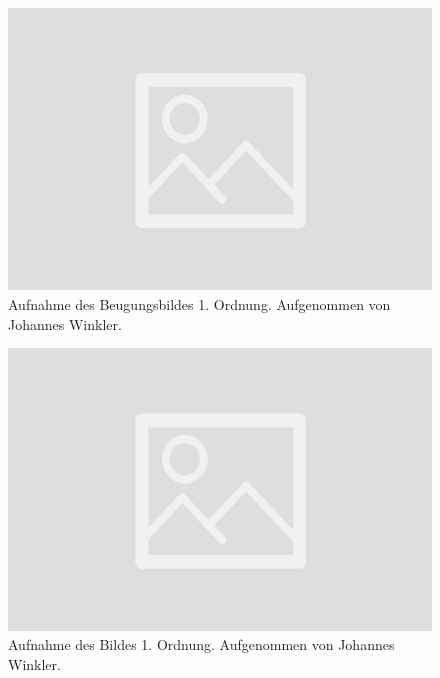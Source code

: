 \documentclass{article}
\begin{document}
\begin{minipage}[t]{.45\textwidth}
\begin{figure}[H]
\includegraphics[scale=0.1]{jw/Beugungsbild_1.jpg}
\caption{Aufnahme des Beugungsbildes 1. Ordnung. Aufgenommen von Johannes Winkler.}
\label{fig:bbild_1_jw}
\end{figure}
\end{minipage}
\hfill
\noindent
\begin{minipage}[t]{.45\textwidth}
\begin{figure}[H]
\includegraphics[scale=0.1]{jw/Bild_1.jpg}
\caption{Aufnahme des Bildes 1. Ordnung. Aufgenommen von Johannes Winkler.}\label{fig:bild_1_jw}
\end{figure}
\end{minipage}
\end{document}
